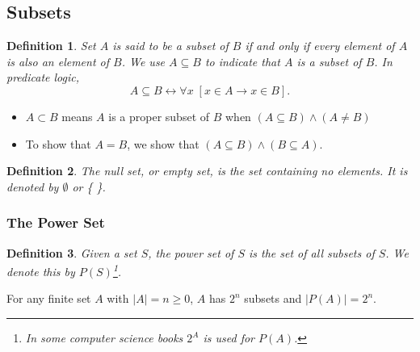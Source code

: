 \documentclass[12pt]{article}
\newtheorem{definition}{Definition} [section]
\begin{document}
\subsection{Subsets}
\begin{definition}
\emph{Set $A$ is said to be a subset of $B$ if and only if every element of $A$ is also an element of $B$. We use $A \subseteq B$ to indicate that $A$ is a subset of $B$. In predicate logic,} 
\[A \subseteq B \leftrightarrow \forall x \; [x \in A \rightarrow x \in B].\]
\end{definition}
\begin{itemize}
\item $A \subset B$ means $A$ is a proper subset of $B$ when $(A \subseteq B) \wedge (A \neq B)$
\item To show that $A=B$, we show that $(A \subseteq B) \wedge (B \subseteq A)$.
\end{itemize}
\begin{definition}\emph{The }null set, \emph{or }empty set, \emph{is the set containing no elements. It is denoted by $\emptyset$ or \{ \}.}\end{definition}
\subsubsection{The Power Set}
\begin{definition} \emph{Given a set $S$, the }power set \emph{of $S$ is the set of all subsets of $S$. We denote this by $P(S)$\footnote{In some computer science books $2^A$ is used for $P(A)$.}.}\end{definition}
For any finite set $A$ with $|A| = n \geq 0$, $A$ has $2^n$ subsets and $|P(A)| = 2^n$.
\end{document}
